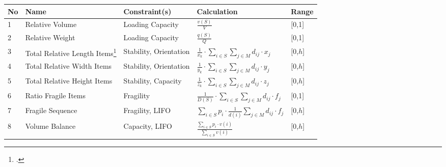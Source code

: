 \begin{table}[!ht]
	\centering
	\small
	\renewcommand{\arraystretch}{2.0}
	\begin{tabular}{@{}P{0.08\textwidth}P{0.16\textwidth}P{0.26\textwidth}P{0.28\textwidth}@{}P{0.1\textwidth}@{}}
		\toprule
		No & Name                                                                                             & Constraint(s)          & Calculation                                                                                           & Range   \\
		  & Relative Volume                                                                                  & Loading Capacity       & $\displaystyle\frac{v(S)}{V}$                                                                         & [0,1]   \\
		2  & Relative Weight                                                                                  & Loading Capacity       & $\displaystyle\frac{q(S)}{Q}$                                                                         & [0,1]   \\
		3  & Total Relative Length Items\footcite[Feature is adapted from][p. 21]{sarah_de_wolf_machine_2022} & Stability, Orientation & $\displaystyle\frac{1}{x_k} \cdot \sum_{i \in S}\sum_{j \in M} d_{ij} \cdot x_j$                      & [0,$h$] \\
		4  & Total Relative Width Items \footnotemark[\value{footnote}]                                       & Stability, Orientation & $\displaystyle\frac{1}{y_k} \cdot \sum_{i \in S}\sum_{j \in M} d_{ij} \cdot y_j$                      & [0,$h$] \\
		5  & Total Relative Height Items  \footnotemark[\value{footnote}]                                     & Stability, Capacity    & $\displaystyle\frac{1}{z_k} \cdot \sum_{i \in S}\sum_{j \in M} d_{ij} \cdot z_j$                      & [0,$h$] \\
		6  & Ratio Fragile Items                                                                              & Fragility              & $\displaystyle\frac{1}{D(S)} \cdot \sum_{i \in S}\sum_{j \in M} d_{ij} \cdot f_j$                     & [0,1]   \\
		7  & Fragile Sequence                                                                                 & Fragility, \gls{LIFO}  & $\displaystyle\sum_{i \in S}p_i \cdot \frac{1}{d(i)}\sum_{j\in M} d_{ij}\cdot f_j $                   & [0,$h$] \\
		8  & Volume Balance                                                                                   & Capacity, \gls{LIFO}   & $\frac{\displaystyle\sum\nolimits_{i \in S}p_i \cdot v(i)}{\displaystyle\sum\nolimits_{i \in S}v(i)}$ & [0,$h$] \\

\end{tabular}
\end{table}
